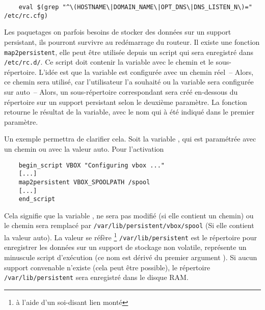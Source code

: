\begin{example}
\begin{verbatim}
    eval $(grep "^\(HOSTNAME\|DOMAIN_NAME\|OPT_DNS\|DNS_LISTEN_N\)=" /etc/rc.cfg)
\end{verbatim}
\end{example}



Les paquetages on parfois besoins de stocker des données sur un support
persistant, ils pourront survivre au redémarrage du routeur. Il existe une
fonction \texttt{map2persistent}, elle peut être utilisée depuis un script
qui sera enregistré dans \texttt{/etc/rc.d/}. Ce script doit contenir
la variable avec le chemin et le sous-répertoire. L'idée est que la variable
est configurée avec un chemin réel~-- Alors, ce chemin sera utilisé, car l'utilisateur
l'a souhaité ou la variable sera configurée sur \og{}auto\fg{}~-- Alors, un
sous-répertoire correspondant sera créé en-dessous du répertoire sur un support
persistant selon le deuxième paramètre. La fonction retourne le résultat de la variable,
avec le nom qui à été indiqué dans le premier paramètre.

Un exemple permettra de clarifier cela. Soit la variable , qui
est paramétrée avec un chemin ou avec la valeur \og{}auto\fg{}. Pour l'activation

\begin{example}
\begin{verbatim}
    begin_script VBOX "Configuring vbox ..."
    [...]
    map2persistent VBOX_SPOOLPATH /spool
    [...]
    end_script
\end{verbatim}
\end{example}

Cela signifie que la variable , ne sera pas modifié
(si elle contient un chemin) ou le chemin sera remplacé par
\texttt{/var/lib/persistent/vbox/spool} (Si elle contient la valeur \og{}auto\fg{}).
La valeur se réfère \footnote{à l'aide d'un soi-disant \og{}lien\fg{} monté}
\texttt{/var/lib/persistent} est le répertoire pour enregistrer les données sur
un support de stockage non volatile,  représente un minuscule script
d'exécution (ce nom est dérivé du premier argument
). Si aucun support
convenable n'existe (cela peut être possible), le répertoire \texttt{/var/lib/persistent}
sera enregistré dans le disque RAM.

